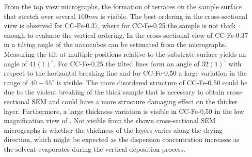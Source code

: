 \documentclass[\main/dresen_thesis.tex]{subfiles}
\begin{document}
  From the top view micrographs, the formation of terraces on the sample surface that stretch over several $100 \unit{nm}$ is visible.
  The best ordering in the cross-sectional view is observed for CC-Fe-0.37, where for CC-Fe-0.25 the sample is not thick enough to evaluate the vertical ordering.
  In the cross-sectional view of CC-Fe-0.37 in  a tilting angle of the nanocubes can be estimated from the micrographs.
  Measuring the tilt at multiple positions relative to the substrate surface yields an angle of $41(1) ^\circ$.
  For CC-Fe-0.25 the tilted lines form an angle of $32(1) ^\circ$ with respect to the horizontal breaking line and for CC-Fe-0.50 a large variation in the range of $40 - 55 ^\circ$ is visible.
  The more disordered structure of CC-Fe-0.50 could be due to the violent breaking of the thick sample that is necessary to obtain cross-sectional SEM and could have a more structure damaging effect on the thicker layer.
  Furthermore, a large thickness variation is visible in CC-Fe-0.50 in the low magnification view of .
  Not visible from the shown cross-sectional SEM micrographs is whether the thickness of the layers varies along the drying direction, which might be expected as the dispersion concentration increases as the solvent evaporates during the vertical deposition process.
\end{document}

